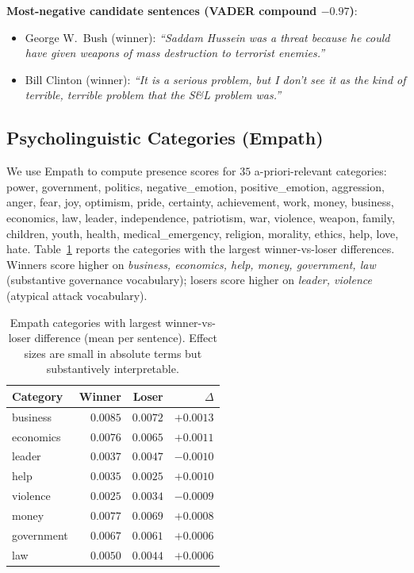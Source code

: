 \documentclass[journal]{IEEEtran}
\newcommand{\winner}{\textcolor[HTML]{1B5E20}}
\begin{document}
\noindent\textbf{Most-negative candidate sentences (VADER compound $-0.97$)}:
\begin{itemize}\itemsep0pt
  \item \winner{George W.\ Bush (winner):} \emph{``Saddam Hussein was
        a threat because he could have given weapons of mass destruction
        to terrorist enemies.''}
  \item \winner{Bill Clinton (winner):} \emph{``It is a serious problem,
        but I don't see it as the kind of terrible, terrible problem
        that the S\&L problem was.''}
\end{itemize}

\subsection{Psycholinguistic Categories (Empath)}
We use Empath \cite{fast2016empath} to compute presence scores for
$35$ a-priori-relevant categories: power, government, politics,
negative\_emotion, positive\_emotion, aggression, anger, fear, joy,
optimism, pride, certainty, achievement, work, money, business,
economics, law, leader, independence, patriotism, war, violence,
weapon, family, children, youth, health, medical\_emergency, religion,
morality, ethics, help, love, hate.
Table~\ref{tab:empath} reports the categories with the largest
winner-vs-loser differences. Winners score higher on
\emph{business, economics, help, money, government, law} (substantive
governance vocabulary); losers score higher on \emph{leader,
violence} (atypical attack vocabulary).

\begin{table}[t]
\caption{Empath categories with largest winner-vs-loser difference
(mean per sentence). Effect sizes are small in absolute terms but
substantively interpretable.}
\label{tab:empath}
\centering
\begin{tabular}{lrrr}
\toprule
Category          & Winner & Loser & $\Delta$ \\
\midrule
business          & $0.0085$ & $0.0072$ & $+0.0013$ \\
economics         & $0.0076$ & $0.0065$ & $+0.0011$ \\
leader            & $0.0037$ & $0.0047$ & $-0.0010$ \\
help              & $0.0035$ & $0.0025$ & $+0.0010$ \\
violence          & $0.0025$ & $0.0034$ & $-0.0009$ \\
money             & $0.0077$ & $0.0069$ & $+0.0008$ \\
government        & $0.0067$ & $0.0061$ & $+0.0006$ \\
law               & $0.0050$ & $0.0044$ & $+0.0006$ \\
\bottomrule
\end{tabular}
\end{table}
\end{document}
